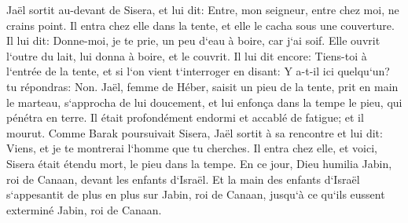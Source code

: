 \verse Jaël sortit au-devant de Sisera, et lui dit: Entre, mon seigneur, entre chez moi, ne crains point. Il entra chez elle dans la tente, et elle le cacha sous une couverture. 
\verse Il lui dit: Donne-moi, je te prie, un peu d`eau à boire, car j`ai soif. Elle ouvrit l`outre du lait, lui donna à boire, et le couvrit. 
\verse Il lui dit encore: Tiens-toi à l`entrée de la tente, et si l`on vient t`interroger en disant: Y a-t-il ici quelqu`un? tu répondras: Non. 
\verse Jaël, femme de Héber, saisit un pieu de la tente, prit en main le marteau, s`approcha de lui doucement, et lui enfonça dans la tempe le pieu, qui pénétra en terre. Il était profondément endormi et accablé de fatigue; et il mourut. 
\verse Comme Barak poursuivait Sisera, Jaël sortit à sa rencontre et lui dit: Viens, et je te montrerai l`homme que tu cherches. Il entra chez elle, et voici, Sisera était étendu mort, le pieu dans la tempe. 
\verse En ce jour, Dieu humilia Jabin, roi de Canaan, devant les enfants d`Israël. 
\verse Et la main des enfants d`Israël s`appesantit de plus en plus sur Jabin, roi de Canaan, jusqu`à ce qu`ils eussent exterminé Jabin, roi de Canaan. 

\chapter{}

